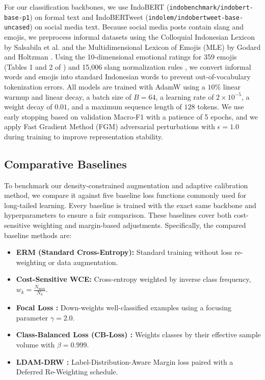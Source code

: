 \documentclass[10pt,journal,compsoc]{IEEEtran}
\begin{document}
For our classification backbones, we use IndoBERT (\texttt{indobenchmark/}\allowbreak\texttt{indobert-}\allowbreak\texttt{base-p1}) on formal text and IndoBERTweet (\texttt{indolem/}\allowbreak\texttt{indobertweet-}\allowbreak\texttt{base-uncased}) on social media text. Because social media posts contain slang and emojis, we preprocess informal datasets using the Colloquial Indonesian Lexicon by Salsabila et al. \cite{salsabila2018colloquial} and the Multidimensional Lexicon of Emojis (MLE) by Godard and Holtzman \cite{godard2022multidimensional}. Using the 10-dimensional emotional ratings for 359 emojis (Tables 1 and 2 of \cite{godard2022multidimensional}) and 15,006 slang normalization rules \cite{salsabila2018colloquial}, we convert informal words and emojis into standard Indonesian words to prevent out-of-vocabulary tokenization errors. All models are trained with AdamW using a $10\%$ linear warmup and linear decay, a batch size of $B=64$, a learning rate of $2 \times 10^{-5}$, a weight decay of $0.01$, and a maximum sequence length of $128$ tokens. We use early stopping based on validation Macro-F1 with a patience of 5 epochs, and we apply Fast Gradient Method (FGM) adversarial perturbations \cite{miyato2018virtual} with $\epsilon = 1.0$ during training to improve representation stability.

\subsection{Comparative Baselines}
\label{subsec:baselines}

To benchmark our density-constrained augmentation and adaptive calibration method, we compare it against five baseline loss functions commonly used for long-tailed learning. Every baseline is trained with the exact same backbone and hyperparameters to ensure a fair comparison. These baselines cover both cost-sensitive weighting and margin-based adjustments. Specifically, the compared baseline methods are:

\begin{itemize}
    \item \textbf{ERM (Standard Cross-Entropy):} Standard training without loss re-weighting or data augmentation.
    \item \textbf{Cost-Sensitive WCE:} Cross-entropy weighted by inverse class frequency, $w_k = \frac{N_{\max}}{N_k}$.
    \item \textbf{Focal Loss \cite{lin2017focal}:} Down-weights well-classified examples using a focusing parameter $\gamma = 2.0$.
    \item \textbf{Class-Balanced Loss (CB-Loss) \cite{cui2019class}:} Weights classes by their effective sample volume with $\beta = 0.999$.
    \item \textbf{LDAM-DRW \cite{cao2019learning, alshammari2022long}:} Label-Distribution-Aware Margin loss paired with a Deferred Re-Weighting schedule.
\end{itemize}
\end{document}
